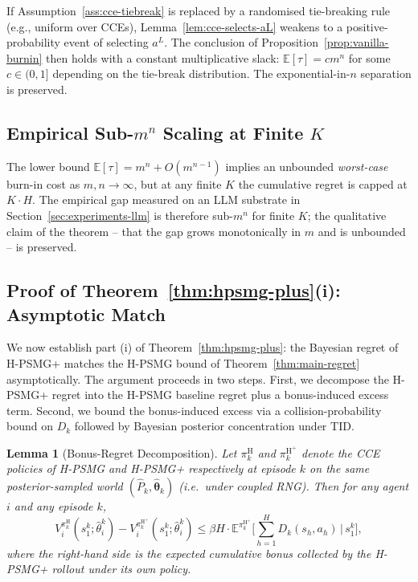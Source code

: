 \documentclass{article}
\newtheorem{lemma}[theorem]{Lemma}
\def\textsuperscript#1{#1}%
\begin{document}
If Assumption~\ref{ass:cce-tiebreak} is replaced by a randomised tie-breaking rule (e.g., uniform over CCEs), Lemma~\ref{lem:cce-selects-aL} weakens to a positive-probability event of selecting $a^L$. The conclusion of Proposition~\ref{prop:vanilla-burnin} then holds with a constant multiplicative slack: $\mathbb{E}[\tau] = c m^n$ for some $c \in (0, 1]$ depending on the tie-break distribution. The exponential-in-$n$ separation is preserved.

\subsection{Empirical Sub-\texorpdfstring{$m^n$}{m\^n} Scaling at Finite \texorpdfstring{$K$}{K}}

The lower bound $\mathbb{E}[\tau] = m^n + O(m^{n-1})$ implies an unbounded \emph{worst-case} burn-in cost as $m, n \to \infty$, but at any finite $K$ the cumulative regret is capped at $K \cdot H$. The empirical gap measured on an LLM substrate in Section~\ref{sec:experiments-llm} is therefore sub-$m^n$ for finite $K$; the qualitative claim of the theorem -- that the gap grows monotonically in $m$ and is unbounded -- is preserved.

\subsection{Proof of Theorem~\ref{thm:hpsmg-plus}(i): Asymptotic Match}
\label{app:hpsmg-plus-asymptotic-proof}

We now establish part (i) of Theorem~\ref{thm:hpsmg-plus}: the Bayesian regret of H-PSMG\textsuperscript{+} matches the H-PSMG bound of Theorem~\ref{thm:main-regret} asymptotically. The argument proceeds in two steps. First, we decompose the H-PSMG\textsuperscript{+} regret into the H-PSMG baseline regret plus a bonus-induced excess term. Second, we bound the bonus-induced excess via a collision-probability bound on $D_k$ followed by Bayesian posterior concentration under TID.

\begin{lemma}[Bonus-Regret Decomposition]
\label{lem:bonus-decomp}
Let $\pi_k^{\mathrm{H}}$ and $\pi_k^{\mathrm{H}^+}$ denote the CCE policies of H-PSMG and H-PSMG\textsuperscript{+} respectively at episode $k$ on the same posterior-sampled world $(\hat P_k, \hat{\boldsymbol\theta}_k)$ (i.e.\ under coupled RNG). Then for any agent $i$ and any episode $k$,
\begin{equation}
V_i^{\pi_k^{\mathrm{H}}}(s_1^k; \hat\theta_i^k) - V_i^{\pi_k^{\mathrm{H}^+}}(s_1^k; \hat\theta_i^k) \leq \beta H \cdot \mathbb{E}^{\pi_k^{\mathrm{H}^+}}\bigg[\sum_{h=1}^H D_k(s_h, a_h) \,\Big|\, s_1^k\bigg],
\end{equation}
where the right-hand side is the expected cumulative bonus collected by the H-PSMG\textsuperscript{+} rollout under its own policy.
\end{lemma}
\end{document}

